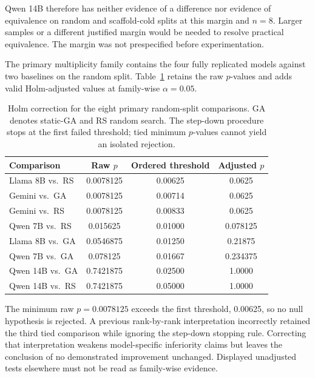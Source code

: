 Qwen 14B therefore has neither evidence of a difference nor evidence of equivalence on random and scaffold-cold splits at this margin and $n=8$. Larger samples or a different justified margin would be needed to resolve practical equivalence. The margin was not prespecified before experimentation.

The primary multiplicity family contains the four fully replicated models against two baselines on the random split. Table~\ref{tab:holm} retains the raw $p$-values and adds valid Holm-adjusted values at family-wise $\alpha=0.05$.

\begin{table}[htbp]
\caption{Holm correction for the eight primary random-split comparisons. GA denotes static-GA and RS random search. The step-down procedure stops at the first failed threshold; tied minimum $p$-values cannot yield an isolated rejection.}
\label{tab:holm}
\centering
\begin{tabular}{@{}lccc@{}}
\toprule
Comparison & Raw $p$ & Ordered threshold & Adjusted $p$ \\
\midrule
Llama 8B vs.\ RS & 0.0078125 & 0.00625 & 0.0625 \\
Gemini vs.\ GA & 0.0078125 & 0.00714 & 0.0625 \\
Gemini vs.\ RS & 0.0078125 & 0.00833 & 0.0625 \\
Qwen 7B vs.\ RS & 0.015625 & 0.01000 & 0.078125 \\
Llama 8B vs.\ GA & 0.0546875 & 0.01250 & 0.21875 \\
Qwen 7B vs.\ GA & 0.078125 & 0.01667 & 0.234375 \\
Qwen 14B vs.\ GA & 0.7421875 & 0.02500 & 1.0000 \\
Qwen 14B vs.\ RS & 0.7421875 & 0.05000 & 1.0000 \\
\bottomrule
\end{tabular}
\end{table}

The minimum raw $p=0.0078125$ exceeds the first threshold, 0.00625, so no null hypothesis is rejected. A previous rank-by-rank interpretation incorrectly retained the third tied comparison while ignoring the step-down stopping rule. Correcting that interpretation weakens model-specific inferiority claims but leaves the conclusion of no demonstrated improvement unchanged. Displayed unadjusted tests elsewhere must not be read as family-wise evidence.

